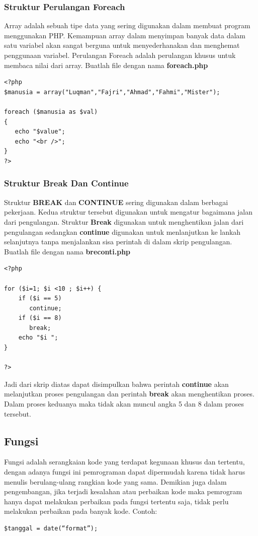 \subsubsection{Struktur Perulangan Foreach}
Array adalah sebuah tipe data yang sering digunakan dalam membuat program menggunakan PHP. Kemampuan array dalam menyimpan banyak data dalam satu variabel akan sangat berguna untuk menyederhanakan dan menghemat penggunaan variabel. Perulangan Foreach adalah perulangan khusus untuk membaca nilai dari array. Buatlah file dengan nama \textbf{foreach.php}
\begin{lstlisting}
<?php
$manusia = array("Luqman","Fajri","Ahmad","Fahmi","Mister");

foreach ($manusia as $val)
{
   echo "$value";
   echo "<br />";
}
?>
\end{lstlisting}

\subsubsection{Struktur Break Dan Continue}
Struktur \textbf{BREAK} dan \textbf{CONTINUE} sering digunakan dalam berbagai pekerjaan. Kedua struktur tersebut digunakan untuk mengatur bagaimana jalan dari pengulangan. Struktur \textbf{Break} digunakan untuk menghentikan jalan dari pengulangan sedangkan \textbf{continue} digunakan untuk menlanjutkan ke lankah selanjutnya tanpa menjalankan sisa perintah di dalam skrip pengulangan. Buatlah file dengan nama \textbf{breconti.php}
\begin{lstlisting}
<?php
 
for ($i=1; $i <10 ; $i++) {
    if ($i == 5)
       continue;
    if ($i == 8)
       break;
    echo "$i ";
}
 
?>
\end{lstlisting}
Jadi dari skrip diatas dapat disimpulkan bahwa perintah  \textbf{continue} akan melanjutkan proses pengulangan dan perintah \textbf{break} akan menghentikan proses. Dalam proses keduanya maka tidak akan muncul angka 5 dan 8 dalam proses tersebut.
\subsection{Fungsi}
Fungsi adalah serangkaian kode yang terdapat kegunaan khusus dan tertentu, dengan adanya fungsi ini pemrograman dapat dipermudah karena tidak harus menulis berulang-ulang rangkian kode yang sama. Demikian juga dalam pengembangan, jika terjadi kesalahan atau perbaikan kode maka pemrogram hanya dapat melakukan perbaikan pada fungsi tertentu saja, tidak perlu melakukan perbaikan pada banyak kode. Contoh:
\begin{lstlisting}
$tanggal = date(“format”);
\end{lstlisting}



